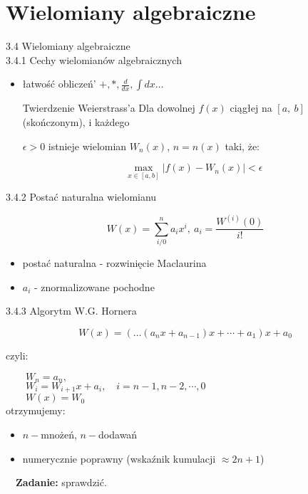 \section{Wielomiany algebraiczne}
	\begin{frame}{3.4 Wielomiany algebraiczne \\ 3.4.1 Cechy wielomianów algebraicznych}
	

	\begin{itemize}
	\item łatwość obliczeń' $+, *, \displaystyle \frac{d}{dx}, \displaystyle \int dx\ldots $ \newline
    
   
    \begin{block}{Twierdzenie Weierstrass'a}
    Dla dowolnej $f(x)$ ciągłej na $[a,\ b]$ (skończonym), i każdego 
   
    $\epsilon>0$ istnieje wielomian $W_{n}(x)$, $n=n(x)$ taki, że:

	\[ \max\limits_{x \in [a,b]}|f(x)-W_{n}(x)|<\epsilon \]
    
    
  	\end{block}
    \end{itemize}
     
	\end{frame}
    
    \begin{frame}{3.4.2 Postać naturalna wielomianu}
    \begin{block}{}
		$$W(x)=\sum_{i/0}^{n}a_{i}x^{i},\ a_{i}=\frac{W^{(i)}(0)}{i!}$$
    \end{block}
        \begin{itemize}
        \item postać naturalna - rozwinięcie Maclaurina \\
        
        \item $a_{i}$ - znormalizowane pochodne
		\end{itemize}
    \end{frame}
    
    \begin{frame}{3.4.3 Algorytm W.G. Hornera}
    \setlength\parindent{24pt} 
	\begin{block}{}
		$$W(x)=(\ldots(a_{n}x+a_{n-1})x+\cdots+a_{1})x+a_{0}$$
	\end{block}
	czyli:
	
	$\qquad W_{n}=a_{n},$ \\
	
	$\qquad W_{i}=W_{i+1}x+a_{i}, \quad i=n-1, n-2, \cdots , 0$ \\
	
	$\qquad W(x)=W_{0}$ \\
	
	otrzymujemy:
	\begin{itemize}
	\item $n-$mnożeń, $n -$dodawań
	\item numerycznie poprawny (wskaźnik kumulacji $\approx 2n+1$)
	\end{itemize} 
    \vspace{3mm}
	$\quad$\textbf{Zadanie:} sprawdzić.
    \end{frame}
    
